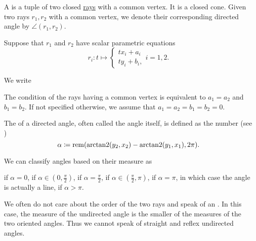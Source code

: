 \begin{definition}\label{def:angle}
  A  is a tuple of two closed \hyperref[def:geometric_ray]{rays} with a common vertex. It is a closed cone. Given two rays \( r_1, r_2 \) with a common vertex, we denote their corresponding directed angle by \( \angle(r_1, r_2) \).

  Suppose that \( r_1 \) and \( r_2 \) have scalar parametric equations
  \begin{equation*}
    r_i: t \mapsto
    \begin{cases}
      tx_i + a_i \\
      ty_i + b_i,
    \end{cases}
    i = 1, 2.
  \end{equation*}

  We write

  The condition of the rays having a common vertex is equivalent to \( a_1 = a_2 \) and \( b_1 = b_2 \). If not specified otherwise, we assume that \( a_1 = a_2 = b_1 = b_2 = 0 \).

  The  of a directed angle, often called the angle itself, is defined as the number (see )
  \begin{equation*}
    \alpha \coloneqq \operatorname{rem}(\operatorname{arctan2}(y_2, x_2) - \operatorname{arctan2}(y_1, x_1), 2\pi).
  \end{equation*}

  We can classify angles based on their measure as
  \begin{defenum}
      if \( \alpha = 0 \),
      if \( \alpha \in (0, \tfrac \pi 2) \),
      if \( \alpha = \tfrac \pi 2 \),
      if \( \alpha \in (\tfrac \pi 2, \pi) \),
      if \( \alpha = \pi \), in which case the angle is actually a line,
      if \( \alpha > \pi \).
  \end{defenum}

  We often do not care about the order of the two rays and speak of an . In this case, the measure of the undirected angle is the smaller of the measures of the two oriented angles. Thus we cannot speak of straight and reflex undirected angles.
\end{definition}

